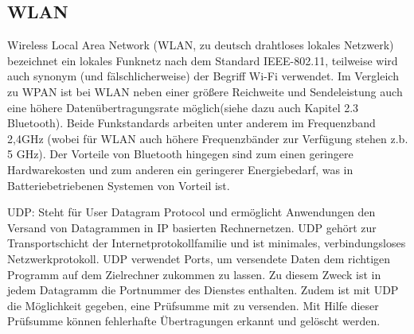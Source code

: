 \subsection{WLAN} \label{grund-wlan-subsubsec}


Wireless Local Area Network (WLAN, zu deutsch drahtloses lokales Netzwerk) bezeichnet ein lokales Funknetz nach dem Standard IEEE-802.11, teilweise wird auch synonym (und fälschlicherweise) der Begriff Wi-Fi verwendet. Im Vergleich zu WPAN ist bei WLAN neben einer größere Reichweite und Sendeleistung auch eine höhere Datenübertragungsrate möglich(siehe dazu auch Kapitel 2.3 Bluetooth). Beide Funkstandards arbeiten unter anderem im Frequenzband 2,4GHz (wobei für WLAN  auch höhere Frequenzbänder zur Verfügung stehen z.b. 5 GHz). Der Vorteile von Bluetooth hingegen sind zum einen geringere Hardwarekosten und zum anderen ein geringerer Energiebedarf, was in Batteriebetriebenen Systemen von Vorteil ist.

UDP:
Steht für User Datagram Protocol  und ermöglicht Anwendungen den Versand von Datagrammen in IP basierten Rechnernetzen. UDP gehört zur Transportschicht der Internetprotokollfamilie und ist minimales, verbindungsloses Netzwerkprotokoll. UDP verwendet Ports, um versendete Daten dem richtigen Programm auf dem Zielrechner zukommen zu lassen.  Zu diesem Zweck ist in jedem Datagramm die Portnummer des Dienstes enthalten. Zudem ist mit UDP die Möglichkeit gegeben, eine Prüfsumme mit zu versenden. Mit Hilfe dieser Prüfsumme können fehlerhafte Übertragungen erkannt und gelöscht werden.


